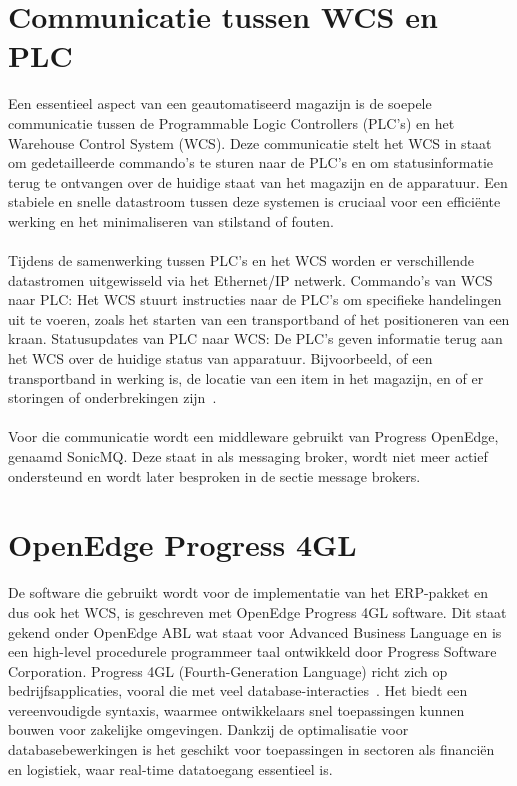 \section{Communicatie tussen WCS en PLC}
Een essentieel aspect van een geautomatiseerd magazijn is de soepele communicatie tussen de Programmable Logic Controllers (PLC’s) en 
het Warehouse Control System (WCS). 
Deze communicatie stelt het WCS in staat om gedetailleerde commando’s te sturen naar de PLC’s en om statusinformatie terug te ontvangen over de huidige staat van het magazijn en de apparatuur. 
Een stabiele en snelle datastroom tussen deze systemen is cruciaal voor een efficiënte werking en het minimaliseren van stilstand of fouten.
\\\\
Tijdens de samenwerking tussen PLC’s en het WCS worden er verschillende datastromen uitgewisseld via het Ethernet/IP netwerk.
Commando’s van WCS naar PLC: Het WCS stuurt instructies naar de PLC’s om specifieke handelingen uit te voeren, zoals het starten van een transportband of het positioneren van een kraan.
Statusupdates van PLC naar WCS: De PLC’s geven informatie terug aan het WCS over de huidige status van apparatuur. Bijvoorbeeld, of een transportband in werking is, 
de locatie van een item in het magazijn, en of er storingen of onderbrekingen zijn~\autocite{Laar2013}.
\\\\
Voor die communicatie wordt een middleware gebruikt van Progress OpenEdge, genaamd SonicMQ. 
Deze staat in als messaging broker, wordt niet meer actief ondersteund en wordt later besproken in de sectie message brokers.

\section{OpenEdge Progress 4GL} 
De software die gebruikt wordt voor de implementatie van het ERP-pakket en dus ook het WCS, is geschreven met OpenEdge Progress 4GL software.
Dit staat gekend onder OpenEdge ABL wat staat voor Advanced Business Language en is een high-level procedurele programmeer taal ontwikkeld door Progress Software Corporation.
Progress 4GL (Fourth-Generation Language) richt zich op bedrijfsapplicaties, vooral die met veel database-interacties~\autocite{OpenEdge2017}. 
Het biedt een vereenvoudigde syntaxis, waarmee ontwikkelaars snel toepassingen kunnen bouwen voor zakelijke omgevingen.
Dankzij de optimalisatie voor databasebewerkingen is het geschikt voor toepassingen in sectoren als financiën en logistiek, 
waar real-time datatoegang essentieel is.
 
